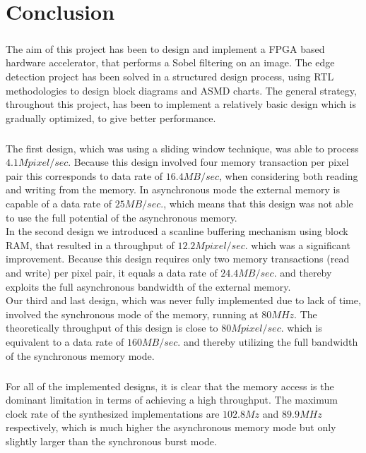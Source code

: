 \chapter{Conclusion}
\paragraph*{ }
The aim of this project has been to design and implement a FPGA based hardware accelerator, that performs a Sobel filtering on an image.
The edge detection project has been solved in a structured design process, using RTL methodologies to design block diagrams and  ASMD charts. The general strategy, throughout this project, has been to implement a relatively basic design which is gradually  optimized, to give better performance.
\paragraph*{ }
The first design, which was using a sliding window technique, was able to process $4.1M pixel/sec.$ Because this design involved four memory transaction per pixel pair this corresponds to data rate of $16.4MB/sec$, when considering both reading and writing from the memory. In asynchronous mode the external memory is capable of a data rate of $25MB/sec.$, which means that this design was not able to use the full potential of the asynchronous memory.\\
In the second design we introduced a scanline buffering mechanism using block RAM, that resulted in a throughput of $12.2M pixel/sec.$ which was a significant improvement. Because this design requires only two memory transactions (read and write) per pixel pair, it equals a data rate of $24.4MB/sec.$ and thereby exploits the full asynchronous bandwidth of the external memory. \\
Our third and last design, which was never fully implemented due to lack of time, involved the synchronous mode of the memory, running at $80MHz$. The theoretically throughput of this design is close to $80M pixel/sec.$ which is equivalent to a data rate of $160MB/sec.$ and thereby utilizing the full bandwidth of the synchronous memory mode.
\paragraph*{ }
For all of the implemented designs, it is clear that the memory access is the dominant limitation in terms of achieving a high throughput. The maximum clock rate of the synthesized implementations are $102.8Mz$ and $89.9MHz$ respectively, which is much higher the asynchronous memory mode but only slightly larger than the synchronous burst mode.



\newpage